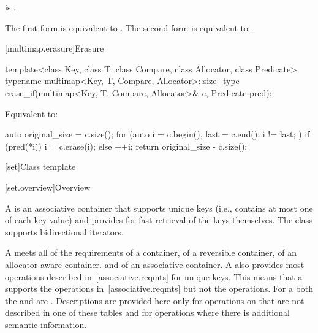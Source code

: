 \begin{itemdescr}
\pnum
\constraints
{} is .

\pnum
\effects
The first form is equivalent to
. The second form is
equivalent to .
\end{itemdescr}

[multimap.erasure]{Erasure}

%
\begin{itemdecl}
template<class Key, class T, class Compare, class Allocator, class Predicate>
  typename multimap<Key, T, Compare, Allocator>::size_type
    erase_if(multimap<Key, T, Compare, Allocator>& c, Predicate pred);
\end{itemdecl}

\begin{itemdescr}
\pnum
\effects
Equivalent to:
\begin{codeblock}
auto original_size = c.size();
for (auto i = c.begin(), last = c.end(); i != last; ) {
  if (pred(*i)) {
    i = c.erase(i);
  } else {
    ++i;
  }
}
return original_size - c.size();
\end{codeblock}
\end{itemdescr}

[set]{Class template }

[set.overview]{Overview}

\pnum
{}%
A
is an associative container that supports unique keys (i.e., contains at most one of each key value) and
provides for fast retrieval of the keys themselves.
The
 class
supports bidirectional iterators.

\pnum
A  meets all of the requirements
of a container,
of a reversible container,
of an allocator-aware container. and
of an associative container.
A
also provides most operations described in~\ref{associative.reqmts}
for unique keys.
This means that a
supports the
operations in~\ref{associative.reqmts}
but not the
operations.
For a
both the
and
are
.
Descriptions are provided here only for operations on
that are not described in one of these tables
and for operations where there is additional semantic information.

